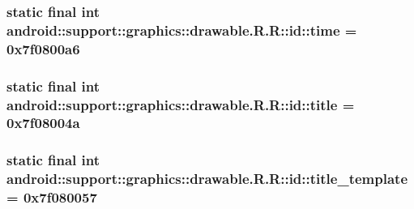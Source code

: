\hypertarget{classandroid_1_1support_1_1graphics_1_1drawable_1_1_r_1_1id_1518949b52321a37dc979412cb3adf36}{
\subsubsection[{time}]{\setlength{\rightskip}{0pt plus 5cm}static final int android::support::graphics::drawable.R.R::id::time = 0x7f0800a6}}
\label{classandroid_1_1support_1_1graphics_1_1drawable_1_1_r_1_1id_1518949b52321a37dc979412cb3adf36}


\hypertarget{classandroid_1_1support_1_1graphics_1_1drawable_1_1_r_1_1id_74d998a0f81cde2daf81d4c27e648e8c}{
\subsubsection[{title}]{\setlength{\rightskip}{0pt plus 5cm}static final int android::support::graphics::drawable.R.R::id::title = 0x7f08004a}}
\label{classandroid_1_1support_1_1graphics_1_1drawable_1_1_r_1_1id_74d998a0f81cde2daf81d4c27e648e8c}


\hypertarget{classandroid_1_1support_1_1graphics_1_1drawable_1_1_r_1_1id_772fb1e4818fb6a6f0860468f5037905}{
\subsubsection[{title\_\-template}]{\setlength{\rightskip}{0pt plus 5cm}static final int android::support::graphics::drawable.R.R::id::title\_\-template = 0x7f080057}}
\label{classandroid_1_1support_1_1graphics_1_1drawable_1_1_r_1_1id_772fb1e4818fb6a6f0860468f5037905}


